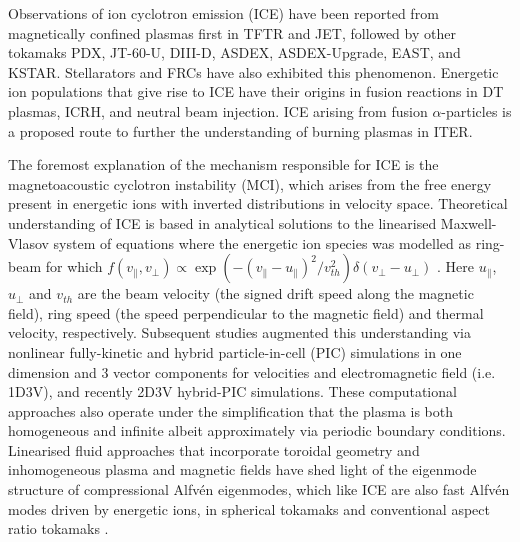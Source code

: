 \documentclass[12pt]{iopart}
\begin{document}
Observations of ion cyclotron emission (ICE) have been reported from magnetically confined plasmas first in TFTR\cite{Cauffman1995,Dendy1995} and JET\cite{Cottrell1988,Cottrell1993,Dendy1995}, followed by other tokamaks PDX\cite{Heidbrink1994}, JT-60-U\cite{Ichimura2008}, DIII-D\cite{Heidbrink2011}, ASDEX\cite{DInca2014}, ASDEX-Upgrade\cite{Ochoukov2018}, EAST\cite{Liu2020}, and KSTAR\cite{Chapman2017,Chapman2018}. Stellarators\cite{Saito2013} and FRCs\cite{Nicks2020} have also exhibited this phenomenon. Energetic ion populations that give rise to ICE have their origins in fusion reactions in DT plasmas\cite{Cottrell2000, Cauffman1995}, ICRH\cite{Cottrell2000}, and neutral beam injection\cite{Ochoukov2018}. ICE arising from fusion $\alpha$-particles is a proposed route to further the understanding of burning plasmas in ITER\cite{Dendy2015,McClements2015}. 

The foremost explanation of the mechanism responsible for ICE is the magnetoacoustic cyclotron instability (MCI)\cite{Belikov1976}, which arises from the free energy present in energetic ions with inverted distributions in velocity space. Theoretical understanding of ICE is based in analytical solutions to the linearised Maxwell-Vlasov system of equations\cite{Stix} where the energetic ion species was modelled as ring-beam for which $f(v_\parallel, v_\perp) \propto \exp(-(v_\parallel-u_\parallel)^2/ v_{th}^2)\delta(v_\perp - u_\bot)$ \cite{Dendy1994, McClements1996}. Here $u_\parallel$, $u_\perp$ and $v_{th}$ are the beam velocity (the signed drift speed along the magnetic field), ring speed (the speed perpendicular to the magnetic field) and thermal velocity, respectively. Subsequent studies augmented this understanding via nonlinear fully-kinetic\cite{Cook2013,Chapman2017} and hybrid\cite{Carbajal2014,Reman2019} particle-in-cell (PIC) simulations in one dimension and 3 vector components for velocities and electromagnetic field (i.e. 1D3V), and recently 2D3V hybrid-PIC simulations\cite{Carbajal2021}. These computational approaches also operate under the simplification that the plasma is both homogeneous and infinite albeit approximately via periodic boundary conditions. Linearised fluid approaches that incorporate toroidal geometry and inhomogeneous plasma and magnetic fields have shed light of the eigenmode structure of compressional Alfv{\'e}n eigenmodes, which like ICE are also fast Alfv{\'e}n modes driven by energetic ions, in spherical tokamaks\cite{Sharapov2014, Gorelenkov2016} and conventional aspect ratio tokamaks \cite{Kolesnichenko2000, Fulop2000, Heidbrink2006}.
\end{document}
